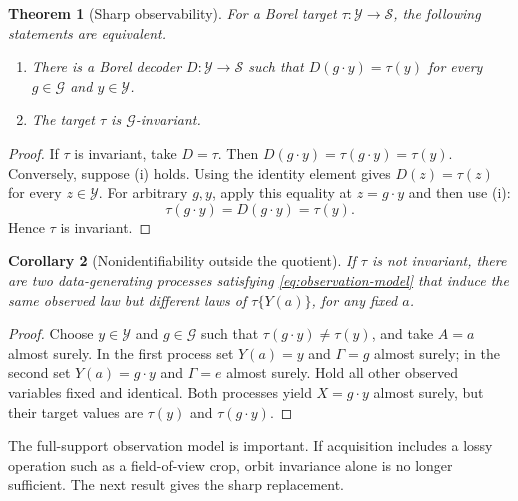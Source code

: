\documentclass[11pt]{article}
\newtheorem{theorem}{Theorem}[section]
\newtheorem{corollary}[theorem]{Corollary}
\theoremstyle{definition}
\theoremstyle{remark}
\newcommand{\cY}{\mathcal Y}
\newcommand{\cS}{\mathcal S}
\newcommand{\cG}{\mathcal G}
\newcommand{\1}{\mathbf 1}
\begin{document}
\begin{theorem}[Sharp observability]\label{thm:sharp}
For a Borel target \(\tau:\cY\to\cS\), the following statements are equivalent.
\begin{enumerate}[label=(\roman*)]
  \item There is a Borel decoder \(D:\cY\to\cS\) such that
  \(D(g\cdot y)=\tau(y)\) for every \(g\in\cG\) and \(y\in\cY\).
  \item The target \(\tau\) is \(\cG\)-invariant.
\end{enumerate}
\end{theorem}

\begin{proof}
If \(\tau\) is invariant, take \(D=\tau\).  Then
\(D(g\cdot y)=\tau(g\cdot y)=\tau(y)\).  Conversely, suppose (i) holds.
Using the identity element gives \(D(z)=\tau(z)\) for every \(z\in\cY\).
For arbitrary \(g,y\), apply this equality at \(z=g\cdot y\) and then use (i):
\[
  \tau(g\cdot y)=D(g\cdot y)=\tau(y).
\]
Hence \(\tau\) is invariant.
\end{proof}

\begin{corollary}[Nonidentifiability outside the quotient]\label{cor:nonid}
If \(\tau\) is not invariant, there are two data-generating processes satisfying
\eqref{eq:observation-model} that induce the same observed law but different
laws of \(\tau\{Y(a)\}\), for any fixed \(a\).
\end{corollary}

\begin{proof}
Choose \(y\in\cY\) and \(g\in\cG\) such that
\(\tau(g\cdot y)\ne\tau(y)\), and take \(A=a\) almost surely.  In the first process set
\(Y(a)=y\) and \(\Gamma=g\) almost surely; in the second set
\(Y(a)=g\cdot y\) and \(\Gamma=e\) almost surely.  Hold all other observed
variables fixed and identical.  Both processes yield \(X=g\cdot y\) almost
surely, but their target values are \(\tau(y)\) and \(\tau(g\cdot y)\).
\end{proof}

The full-support observation model is important.  If acquisition includes a
lossy operation such as a field-of-view crop, orbit invariance alone is no
longer sufficient.  The next result gives the sharp replacement.
\end{document}
